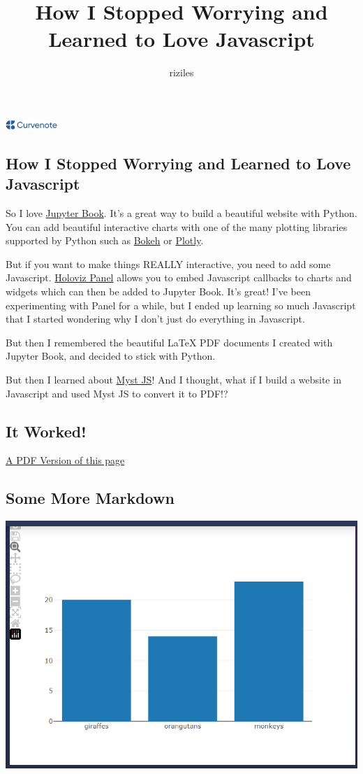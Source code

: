 \documentclass{article}
\title{How I Stopped Worrying and Learned to Love Javascript}
\author{riziles}
\date{\displaydate{articleDate}}
\newcommand{\logo}{
  \href{https://curvenote.com}{\includegraphics[width=2cm]{curvenote.png}}
}
\begin{document}
\maketitle
\begin{center}\logo\end{center}


\subsection*{How I Stopped Worrying and Learned to Love Javascript}

So I love \href{https://jupyterbook.org/en/stable/start/your-first-book.html}{Jupyter Book}.
It's a great way to build a beautiful website with Python.
You can add beautiful interactive charts with one of the many plotting libraries supported by Python
such as \href{https://bokeh.org/}{Bokeh} or \href{https://plotly.com/python/}{Plotly}.

But if you want to make things REALLY interactive, you need to add some Javascript.
\href{https://panel.holoviz.org/user_guide/Links.html#defining-javascript-callbacks}{Holoviz Panel}
allows you to embed Javascript callbacks to charts and widgets which
can then be added to Jupyter Book. It's great! I've been experimenting with Panel for a while,
but I ended up learning so much Javascript that I started wondering why I don't just do everything in Javascript.

But then I remembered the beautiful LaTeX PDF documents I created with Jupyter Book,
and decided to stick with Python.

But then I learned about \href{https://myst-tools.org/docs/mystjs}{Myst JS}! And I thought,
what if I build a website in Javascript and used Myst JS to convert it to PDF!?

\subsection*{It Worked!}

\href{%7BassStr%7D/my-document.pdf}{A PDF Version of this page}

\subsection*{Some More Markdown}

\includegraphics[width=0.7\linewidth]{images/Capture-037f1a6709c029d6e4166b657d95e6ef.PNG}
\end{document}
